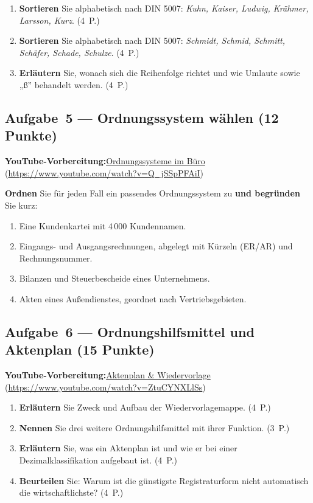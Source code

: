 \documentclass[11pt, a4paper]{article}
\begin{document}
\medskip
\begin{enumerate}[label=(\alph*)]
  \item \textbf{Sortieren} Sie alphabetisch nach DIN 5007: \emph{Kuhn, Kaiser, Ludwig, Krähmer, Larsson, Kurz}. \hfill (4~P.)
  \item \textbf{Sortieren} Sie alphabetisch nach DIN 5007: \emph{Schmidt, Schmid, Schmitt, Schäfer, Schade, Schulze}. \hfill (4~P.)
  \item \textbf{Erläutern} Sie, wonach sich die Reihenfolge richtet und wie Umlaute sowie „ß” behandelt werden. \hfill (4~P.)
\end{enumerate}

\subsection*{Aufgabe~5 --- Ordnungssystem wählen (12 Punkte)}

\noindent\textbf{\color{bfwAccent}YouTube-Vorbereitung:}\enspace \href{https://www.youtube.com/watch?v=Q_jSSpPFAiI}{Ordnungssysteme im Büro} (\url{https://www.youtube.com/watch?v=Q_jSSpPFAiI})

\medskip
\textbf{Ordnen} Sie für jeden Fall ein passendes Ordnungssystem zu \textbf{und begründen} Sie kurz:

\begin{enumerate}[label=\arabic*., leftmargin=*]
  \item Eine Kundenkartei mit 4\,000 Kundennamen.
  \item Eingangs- und Ausgangsrechnungen, abgelegt mit Kürzeln (ER/AR) und Rechnungsnummer.
  \item Bilanzen und Steuerbescheide eines Unternehmens.
  \item Akten eines Außendienstes, geordnet nach Vertriebsgebieten.
\end{enumerate}

\subsection*{Aufgabe~6 --- Ordnungshilfsmittel und Aktenplan (15 Punkte)}

\noindent\textbf{\color{bfwAccent}YouTube-Vorbereitung:}\enspace \href{https://www.youtube.com/watch?v=ZtuCYNXLlSs}{Aktenplan \& Wiedervorlage} (\url{https://www.youtube.com/watch?v=ZtuCYNXLlSs})

\medskip
\begin{enumerate}[label=(\alph*)]
  \item \textbf{Erläutern} Sie Zweck und Aufbau der Wiedervorlagemappe. \hfill (4~P.)
  \item \textbf{Nennen} Sie drei weitere Ordnungshilfsmittel mit ihrer Funktion. \hfill (3~P.)
  \item \textbf{Erläutern} Sie, was ein Aktenplan ist und wie er bei einer Dezimalklassifikation aufgebaut ist. \hfill (4~P.)
  \item \textbf{Beurteilen} Sie: Warum ist die günstigste Registraturform nicht automatisch die wirtschaftlichste? \hfill (4~P.)
\end{enumerate}
\end{document}
